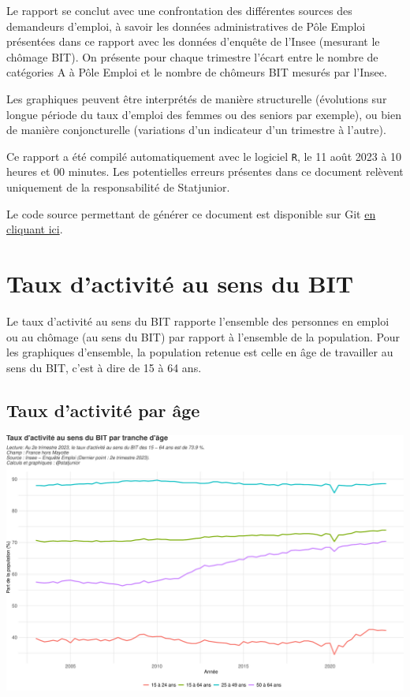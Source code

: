\documentclass[
  paper=a4,
  ,captions=tableheading
]{scrartcl}
\begin{document}
Le rapport se conclut avec une confrontation des différentes sources des
demandeurs d'emploi, à savoir les données administratives de Pôle Emploi
présentées dans ce rapport avec les données d'enquête de l'Insee
(mesurant le chômage BIT). On présente pour chaque trimestre l'écart
entre le nombre de catégories A à Pôle Emploi et le nombre de chômeurs
BIT mesurés par l'Insee.

Les graphiques peuvent être interprétés de manière structurelle
(évolutions sur longue période du taux d'emploi des femmes ou des
seniors par exemple), ou bien de manière conjoncturelle (variations d'un
indicateur d'un trimestre à l'autre).

Ce rapport a été compilé automatiquement avec le logiciel \texttt{R}, le
11 août 2023 à 10 heures et 00 minutes. Les potentielles erreurs
présentes dans ce document relèvent uniquement de la responsabilité de
Statjunior.

Le code source permettant de générer ce document est disponible sur Git
\href{https://github.com/statjunior/Statjunior/blob/main/March\%C3\%A9\%20du\%20travail\%20et\%20ch\%C3\%B4mage/}{en
cliquant ici}.

\newpage

\hypertarget{taux-dactivituxe9-au-sens-du-bit}{%
\section{Taux d'activité au sens du
BIT}\label{taux-dactivituxe9-au-sens-du-bit}}

Le taux d'activité au sens du BIT rapporte l'ensemble des personnes en
emploi ou au chômage (au sens du BIT) par rapport à l'ensemble de la
population. Pour les graphiques d'ensemble, la population retenue est
celle en âge de travailler au sens du BIT, c'est à dire de 15 à 64 ans.

\hypertarget{taux-dactivituxe9-par-uxe2ge}{%
\subsection{Taux d'activité par
âge}\label{taux-dactivituxe9-par-uxe2ge}}

\includegraphics{rapport_activite_emploi_chomage_insee_files/figure-latex/unnamed-chunk-2-1.pdf}
\end{document}
